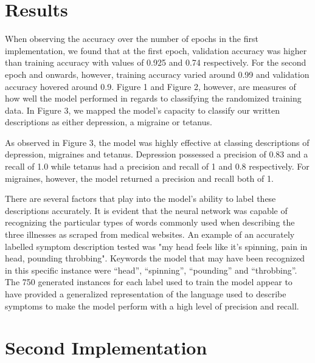 \documentclass[12pt]{report}
\begin{document}
\section{Results}
When observing the accuracy over the number of epochs in the first implementation, 
we found that at the first epoch, validation accuracy was higher than training 
accuracy with values of 0.925 and 0.74 respectively. For the second epoch and onwards, 
however, training accuracy varied around 0.99 and validation accuracy hovered around 
0.9. Figure 1 and Figure 2, however, are measures of how well the model performed 
in regards to classifying the randomized training data. In Figure 3, we mapped the 
model’s capacity to classify our written descriptions as either depression, a 
migraine or tetanus.

As observed in Figure 3, the model was highly effective at classing descriptions of 
depression, migraines and tetanus. Depression possessed a precision of 0.83 and a 
recall of 1.0 while tetanus had a precision and recall of 1 and 0.8 respectively. 
For migraines, however, the model returned a precision and recall both of 1. 

There are several factors that play into the model’s ability to label these descriptions 
accurately. It is evident that the neural network was capable of recognizing the particular 
types of words commonly used when describing the three illnesses as scraped from medical 
websites. An example of an accurately labelled symptom description tested was "my head 
feels like it's spinning, pain in head, pounding throbbing". Keywords the model that 
may have been recognized in this specific instance were “head”, “spinning”, “pounding” and 
“throbbing”. The 750 generated instances for each label used to train the model appear to 
have provided a generalized representation of the language used to describe symptoms to make 
the model perform with a high level of precision and recall. 



\section{Second Implementation}


%
\end{document}
